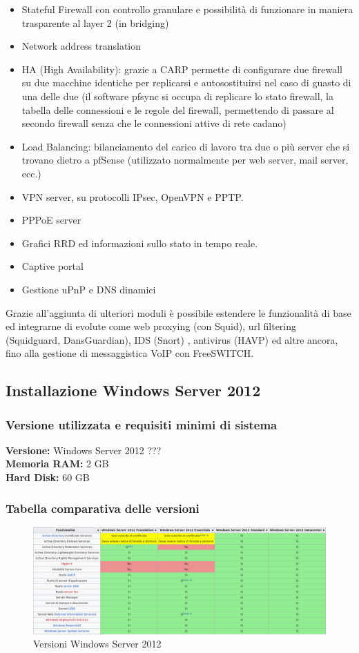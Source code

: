\documentclass{article}
\begin{document}
\begin{itemize}
    \item Stateful Firewall con controllo granulare e possibilità di funzionare in maniera trasparente al layer 2 (in bridging)
    \item Network address translation
    \item HA (High Availability): grazie a CARP permette di configurare due firewall su due macchine identiche per replicarsi e autosostituirsi nel caso di guasto di una delle due (il software pfsync si occupa di replicare lo stato firewall, la tabella delle connessioni e le regole del firewall, permettendo di passare al secondo firewall senza che le connessioni attive di rete cadano)
    \item Load Balancing: bilanciamento del carico di lavoro tra due o più server che si trovano dietro a pfSense (utilizzato normalmente per web server, mail server, ecc.)
    \item VPN server, su protocolli IPsec, OpenVPN e PPTP.
    \item PPPoE server
    \item Grafici RRD ed informazioni sullo stato in tempo reale.
    \item Captive portal
    \item Gestione uPnP e DNS dinamici
\end{itemize}
Grazie all'aggiunta di ulteriori moduli è possibile estendere le funzionalità di base ed integrarne di evolute come web proxying (con Squid), url filtering (Squidguard, DansGuardian), IDS (Snort) , antivirus (HAVP) ed altre ancora, fino alla gestione di messaggistica VoIP con FreeSWITCH. 

\subsection{Installazione Windows Server 2012}
\subsubsection{Versione utilizzata e requisiti minimi di sistema}
\textbf{Versione:} Windows Server 2012 ???\\
\textbf{Memoria RAM:} 2 GB \\
\textbf{Hard Disk:} 60 GB

\subsubsection{Tabella comparativa delle versioni}
\begin{figure}[H]
    \center
    \includegraphics[scale=0.3]{images/tabecomp.png}
    \caption{Versioni Windows Server 2012}\label{fig:1}
\end{figure}
\end{document}
